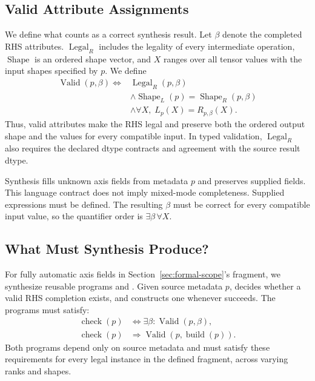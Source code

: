 \subsection{Valid Attribute Assignments}
\label{sec:valid}
We define what counts as a correct synthesis result.
Let $\beta$ denote the completed RHS attributes.
$\operatorname{Legal}_R$ includes the legality of every intermediate
operation, $\operatorname{Shape}$ is an ordered shape vector, and $X$ ranges
over all tensor values with the input shapes specified by $p$. We define
\begin{equation}
\begin{aligned}
 \operatorname{Valid}(p,\beta)\iff{}&
 \operatorname{Legal}_R(p,\beta)\\
 &\land\operatorname{Shape}_L(p)=\operatorname{Shape}_R(p,\beta)\\
 &\land\forall X,\; L_p(X)=R_{p,\beta}(X).
\end{aligned}
\label{eq:valid}
\end{equation}
Thus, valid attributes make the RHS legal and preserve both the ordered
output shape and the values for every compatible input. In typed validation,
$\operatorname{Legal}_R$ also requires the declared dtype contracts and
agreement with the source result dtype.

Synthesis fills unknown axis fields from metadata $p$ and preserves supplied
fields. This language contract does not imply mixed-mode completeness.
Supplied expressions must be defined.
The resulting $\beta$ must be correct for every compatible input value,
so the quantifier order is $\exists\beta\,\forall X$.

\subsection{What Must Synthesis Produce?}
\label{sec:find}
For fully automatic axis fields in Section~\ref{sec:formal-scope}'s fragment,
we synthesize reusable programs  and .
Given source metadata $p$,
 decides whether a valid RHS completion exists, and 
constructs one whenever  succeeds. The programs
must satisfy:
\begin{align}
 \operatorname{check}(p)&\iff\exists\beta:\operatorname{Valid}(p,\beta),
 \label{eq:check-goal}\\
 \operatorname{check}(p)&\Rightarrow
 \operatorname{Valid}(p,\operatorname{build}(p)).
 \label{eq:build-goal}
\end{align}
Both programs depend only on source metadata and must satisfy these
requirements for every legal instance in the defined fragment, across
varying ranks and shapes.

